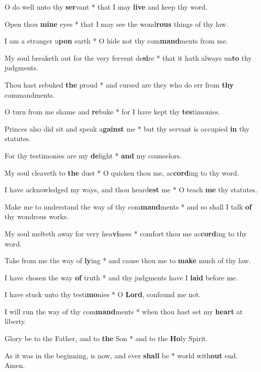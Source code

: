 \begin{multicols}{2}
	O do well unto thy \textbf{ser}vant * that I may \textbf{live} and keep thy word.
	
	Open thou \textbf{mine} eyes * that I may see the wond\textbf{rous} things of thy law.
	
	I am a stranger u\textbf{pon} earth * O hide not thy com\textbf{mand}ments from me.
	
	My soul breaketh out for the very fervent de\textbf{si}re * that it hath always un\textbf{to} thy judgments.
	
	Thou hast rebuked \textbf{the} proud * and cursed are they who do err from \textbf{thy} commandments.
	
	O turn from me shame and \textbf{re}buke * for I have kept thy \textbf{tes}timonies.
	
	Princes also did sit and speak a\textbf{gainst} me * but thy servant is occupied \textbf{in} thy statutes.
	
	For thy testimonies are my \textbf{de}light * \textbf{and} my counselors.
	
	My soul cleaveth to \textbf{the} dust * O quicken thou me, ac\textbf{cord}ing to thy word.
	
	I have acknowledged my ways, and thou heard\textbf{est} me * O teach \textbf{me} thy statutes.
	
	Make me to understand the way of thy com\textbf{mand}ments * and so shall I talk \textbf{of} thy wondrous works.
	
	My soul melteth away for very hea\textbf{vi}ness * comfort thou me ac\textbf{cord}ing to thy word.
	
	Take from me the way of \textbf{ly}ing * and cause thou me to \textbf{make} much of thy law.
	
	I have chosen the way \textbf{of} truth * and thy judgments have I \textbf{laid} before me.
	
	I have stuck unto thy testi\textbf{mo}nies * O \textbf{Lord}, confound me not.
	
	I will run the way of thy com\textbf{mand}ments * when thou hast set my \textbf{heart} at liberty.
	
	Glory be to the Father, and to \textbf{the} Son * and to the \textbf{Ho}ly Spirit.
	
	As it was in the beginning, is now, and ever \textbf{shall} be * world with\textbf{out} end. Amen.
\end{multicols}